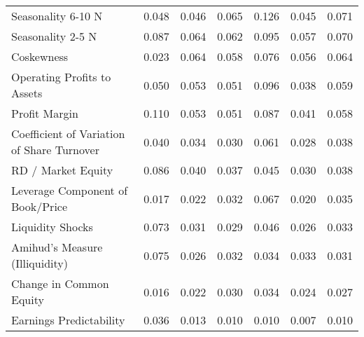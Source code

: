 \begin{tabular}{lrrrrrr}
Seasonality 6-10 N                         &  0.048 &  0.046 &  0.065 &  0.126 &  0.045 &  0.071 \\
Seasonality 2-5 N                          &  0.087 &  0.064 &  0.062 &  0.095 &  0.057 &  0.070 \\
Coskewness                                 &  0.023 &  0.064 &  0.058 &  0.076 &  0.056 &  0.064 \\
Operating Profits to Assets                &  0.050 &  0.053 &  0.051 &  0.096 &  0.038 &  0.059 \\
Profit Margin                              &  0.110 &  0.053 &  0.051 &  0.087 &  0.041 &  0.058 \\
Coefficient of Variation of Share Turnover &  0.040 &  0.034 &  0.030 &  0.061 &  0.028 &  0.038 \\
RD / Market Equity                         &  0.086 &  0.040 &  0.037 &  0.045 &  0.030 &  0.038 \\
Leverage Component of Book/Price           &  0.017 &  0.022 &  0.032 &  0.067 &  0.020 &  0.035 \\
Liquidity Shocks                           &  0.073 &  0.031 &  0.029 &  0.046 &  0.026 &  0.033 \\
Amihud's Measure (Illiquidity)             &  0.075 &  0.026 &  0.032 &  0.034 &  0.033 &  0.031 \\
Change in Common Equity                    &  0.016 &  0.022 &  0.030 &  0.034 &  0.024 &  0.027 \\
Earnings Predictability                    &  0.036 &  0.013 &  0.010 &  0.010 &  0.007 &  0.010 \\
\bottomrule
\end{tabular}
